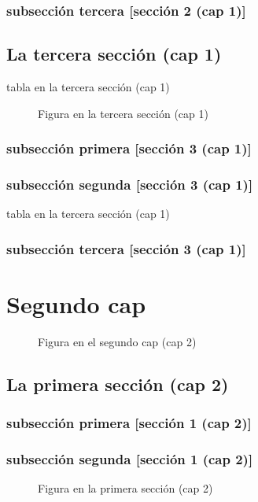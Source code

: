\documentclass[12pt,a4paper]{report}
\begin{document}
\subsection*{subsección tercera [sección 2 (cap 1)]}
\section{La tercera sección (cap 1)}
\begin{table}[H]
\caption{tabla en la tercera sección (cap 1)}
\end{table}
\begin{figure}[H]
\caption{Figura en la tercera sección (cap 1)}
\end{figure}
\subsection{subsección primera [sección 3 (cap 1)]}
\subsection{subsección segunda [sección 3 (cap 1)]}
\begin{table}[H]
\caption{tabla en la tercera sección (cap 1)}
\end{table}
\subsection{subsección tercera [sección 3 (cap 1)]}

\chapter*{Segundo cap}
\begin{figure}[H]
\caption{Figura en el segundo cap (cap 2)}
\end{figure}
\section*{La primera sección (cap 2)}
\subsection*{subsección primera [sección 1 (cap 2)]}
\subsection*{subsección segunda [sección 1 (cap 2)]}
\begin{figure}[H]
\caption{Figura en la primera sección (cap 2)}
\end{figure}
\end{document}
